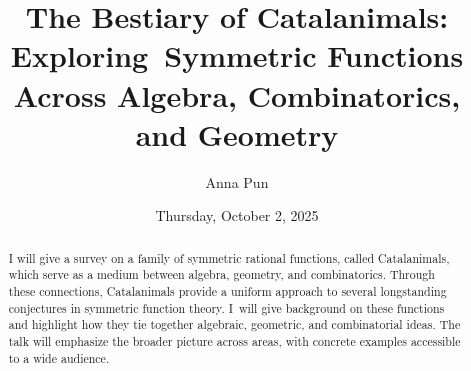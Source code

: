 \documentclass{UAmathtalk}
\author{Anna Pun}
\title{The Bestiary of Catalanimals: Exploring~Symmetric Functions Across Algebra, Combinatorics, and Geometry}
\date{Thursday, October 2, 2025}
\begin{document}
\maketitle

\begin{abstract}
I will give a survey on a family of symmetric rational functions, called Catalanimals, which serve as a medium between algebra, geometry, and combinatorics. Through these connections, Catalanimals provide a uniform approach to several longstanding conjectures in symmetric function theory.
I~will give background on these functions and highlight how they tie together algebraic, geometric, and combinatorial ideas. The talk will emphasize the broader picture across areas, with concrete examples accessible to a wide audience.
\end{abstract}
\end{document}
